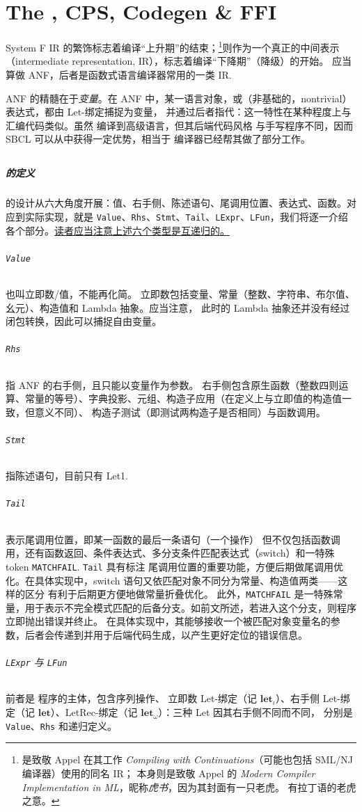 \chapter{The \Lambdair, CPS, Codegen \& FFI}
System F IR 的繁饰标志着编译“上升期”的结束；\Lambdair\footnote{
  \Lambdair 是致敬 Appel 在其工作 \emph{Compiling with Continuations}（可能也包括 SML/NJ 编译器）使用的同名 IR；
  \Tigris 本身则是致敬 Appel 的 \emph{Modern Compiler Implementation in ML}，昵称\emph{虎书}，因为其封面有一只老虎。
  \Tigris 有拉丁语的老虎之意。
}则作为一个真正的中间表示（intermediate representation, IR），标志着编译“下降期”（降级）的开始。
\Lambdair 应当算做 ANF，后者是函数式语言编译器常用的一类 IR.

ANF 的精髓在于\emph{变量}。在 ANF 中，某一语言对象，或（非基础的，nontrivial）表达式，都由 Let-绑定捕捉为变量，
并通过后者指代：这一特性在某种程度上与汇编代码类似。虽然 \Tigris 编译到高级语言，但其后端代码风格
与手写程序不同，因而 SBCL 可以从中获得一定优势，相当于 \Tigris 编译器已经帮其做了部分工作。

\section{\Lambdair}
\paragraph{\Lambdair 的定义}
\Lambdair 的设计从六大角度开展：值、右手侧、陈述语句、尾调用位置、表达式、函数。对应到实际实现，就是
\texttt{Value}、\texttt{Rhs}、\texttt{Stmt}、\texttt{Tail}、\texttt{LExpr}、\texttt{LFun}，我们将逐一介绍
各个部分。\underline{读者应当注意上述六个类型是互递归的。}
{\setlength{\parskip}{-1em}
  \subparagraph*{\texttt{Value}} 也叫立即数/值，不能再化简。
  立即数包括变量、常量（整数、字符串、布尔值、幺元）、构造值和 Lambda 抽象。应当注意，
  此时的 Lambda 抽象还并没有经过闭包转换，因此可以捕捉自由变量。
  \subparagraph*{\texttt{Rhs}} 指 ANF 的右手侧，且只能以变量作为参数。
  右手侧包含原生函数（整数四则运算、常量的等号）、字典投影、元组、构造子应用（在定义上与立即值的构造值一致，但意义不同）、
  构造子测试（即测试两构造子是否相同）与函数调用。
  \subparagraph*{\texttt{Stmt}} 指陈述语句，目前只有 Let1.
  \subparagraph*{\texttt{Tail}} 表示尾调用位置，即某一函数的最后一条语句（一个操作）
  但不仅包括函数调用，还有函数返回、条件表达式、多分支条件匹配表达式（switch）和一特殊 token \texttt{MATCHFAIL}. \texttt{Tail} 具有标注
  尾调用位置的重要功能，方便后期做尾调用优化。在具体实现中，switch 语句又依匹配对象不同分为常量、构造值两类——这样的区分
  有利于后期更方便地做常量折叠优化。
  此外，\texttt{MATCHFAIL} 是一特殊常量，用于表示不完全模式匹配的后备分支。如前文所述，若进入这个分支，则程序立即抛出错误并终止。
  在具体实现中，其能够接收一个被匹配对象变量名的参数，后者会传递到并用于后端代码生成，以产生更好定位的错误信息。
}
\subparagraph{\texttt{LExpr} 与 \texttt{LFun}} 前者是 \Lambdair 程序的主体，包含序列操作、
立即数 Let-绑定（记 $\mathbf{let}_\iota$）、右手侧 Let-绑定（记 $\mathbf{let}$）、LetRec-绑定（记 $\mathbf{let}_\omega$）：三种 Let 因其右手侧不同而不同，
分别是 \texttt{Value}、\texttt{Rhs} 和递归定义。

